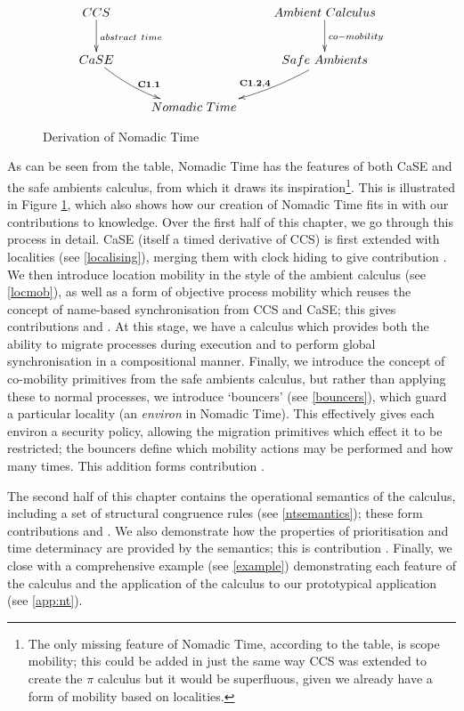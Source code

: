 \begin{figure}  
  \centering
\[\CompileMatrices
\xymatrix{
CCS \ar@{->}[d]^{abstract\ time} & &
Ambient\ Calculus \ar@{->}[d]^{co-mobility} \\ 
CaSE \ar@/_/[dr]^{\mathbf{C1.1}} & &
Safe\ Ambients \ar@/^/[dl]_{\mathbf{C1.2,4}} \\
& Nomadic\ Time & \\
}
\]
\caption{Derivation of Nomadic Time}
\label{fig:ntderiv}
\end{figure}

As can be seen from the table, Nomadic Time has the features of both
CaSE and the safe ambients calculus, from which it draws its
inspiration\footnote{The only missing feature of Nomadic Time,
  according to the table, is scope mobility; this could be added in
  just the same way CCS was extended to create the $\pi$ calculus but
  it would be superfluous, given we already have a form of mobility
  based on localities.}.  This is illustrated in Figure
\ref{fig:ntderiv}, which also shows how our creation of Nomadic Time
fits in with our contributions to knowledge. Over the first half of
this chapter, we go through this process in detail.  CaSE \cite{CaSE}
(itself a timed derivative of CCS) is first extended with localities
(see \ref{localising}), merging them with clock hiding to give
contribution .  We then introduce location mobility in the
style of the ambient calculus (see \ref{locmob}), as well as a form of
objective process mobility which reuses the concept of name-based
synchronisation from CCS and CaSE; this gives contributions 
and . At this stage, we have a calculus which provides both
the ability to migrate processes during execution and to perform
global synchronisation in a compositional manner.  Finally, we
introduce the concept of co-mobility primitives from the safe ambients
calculus, but rather than applying these to normal processes, we
introduce `bouncers' (see \ref{bouncers}), which guard a particular
locality (an \emph{environ} in Nomadic Time).  This effectively gives
each environ a security policy, allowing the migration primitives
which effect it to be restricted; the bouncers define which mobility
actions may be performed and how many times.  This addition forms
contribution .

The second half of this chapter contains the operational semantics of
the calculus, including a set of structural congruence rules (see
\ref{ntsemantics}); these form contributions  and
.  We also demonstrate how the properties of prioritisation
and time determinacy are provided by the semantics; this is
contribution .  Finally, we close with a comprehensive
example (see \ref{example}) demonstrating each feature of the calculus
and the application of the calculus to our prototypical application
(see \ref{app:nt}).

